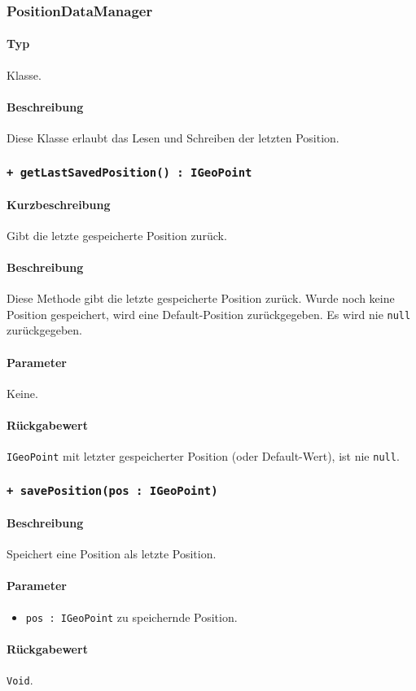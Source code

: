 \subsubsection{PositionDataManager}\label{App_Map_Model_PositionDataManager}
\paragraph*{Typ}
Klasse.
\paragraph*{Beschreibung}
Diese Klasse erlaubt das Lesen und Schreiben der letzten Position.

\subsubsection*{\texttt{+ getLastSavedPosition() : IGeoPoint}}\label{App_Map_Model_getLastSavedPosition_Position}%
\paragraph*{Kurzbeschreibung}
Gibt die letzte gespeicherte Position zurück.
\paragraph*{Beschreibung}
Diese Methode gibt die letzte gespeicherte Position zurück. Wurde noch keine Position gespeichert,
wird eine Default-Position zurückgegeben. Es wird nie \texttt{null} zurückgegeben.
\paragraph*{Parameter}
Keine.
\paragraph*{Rückgabewert}
\texttt{IGeoPoint} mit letzter gespeicherter Position (oder Default-Wert), ist nie \texttt{null}.

\subsubsection*{\texttt{+ savePosition(pos : IGeoPoint)}}\label{App_Map_Model_savePosition_Position}%
\paragraph*{Beschreibung}
Speichert eine Position als letzte Position.
\paragraph*{Parameter}
\begin{itemize}
    \item \texttt{pos : IGeoPoint} zu speichernde Position.
\end{itemize}
\paragraph*{Rückgabewert}
\texttt{Void}.

